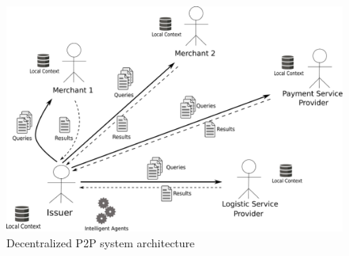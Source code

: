 \begin{figure}[H]
	\centering
		\includegraphics[width=0.9\columnwidth]{images/system_P2P_decentralized.pdf}
	\caption{Decentralized \gls{P2P} system architecture}
\label{fig:images_p2p_decentralized}
\end{figure}


